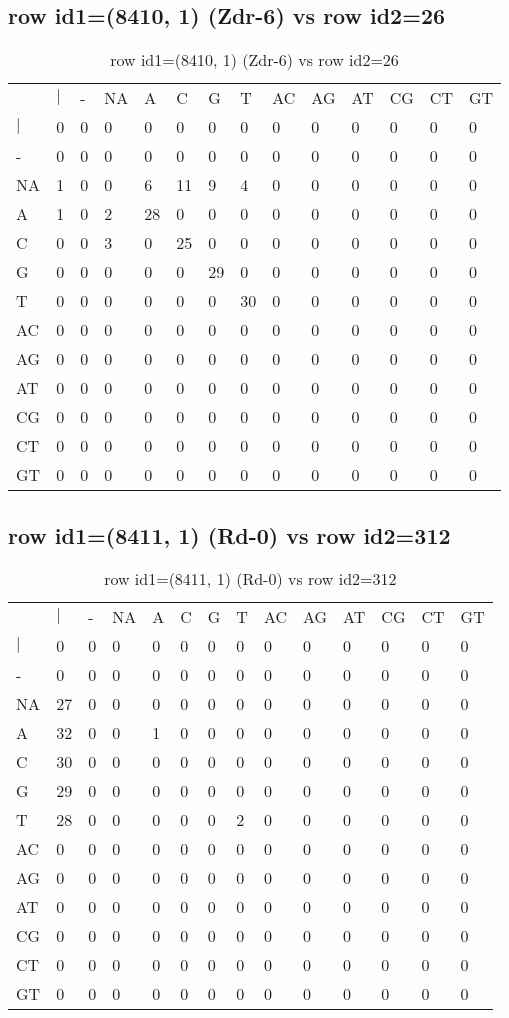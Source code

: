 \subsection{row id1=(8410, 1) (Zdr-6) vs row id2=26}
\begin{center}
\begin{longtable}{|l|l|l|l|l|l|l|l|l|l|l|l|l|l|}
\caption{row id1=(8410, 1) (Zdr-6) vs row id2=26} \label{table_dm682}\\
\hline
\\
\hline
&$|$&-&NA&A&C&G&T&AC&AG&AT&CG&CT&GT\\
$|$&0&0&0&0&0&0&0&0&0&0&0&0&0\\
-&0&0&0&0&0&0&0&0&0&0&0&0&0\\
NA&1&0&0&6&11&9&4&0&0&0&0&0&0\\
A&1&0&2&28&0&0&0&0&0&0&0&0&0\\
C&0&0&3&0&25&0&0&0&0&0&0&0&0\\
G&0&0&0&0&0&29&0&0&0&0&0&0&0\\
T&0&0&0&0&0&0&30&0&0&0&0&0&0\\
AC&0&0&0&0&0&0&0&0&0&0&0&0&0\\
AG&0&0&0&0&0&0&0&0&0&0&0&0&0\\
AT&0&0&0&0&0&0&0&0&0&0&0&0&0\\
CG&0&0&0&0&0&0&0&0&0&0&0&0&0\\
CT&0&0&0&0&0&0&0&0&0&0&0&0&0\\
GT&0&0&0&0&0&0&0&0&0&0&0&0&0\\
\hline
\end{longtable}
\end{center}

\subsection{row id1=(8411, 1) (Rd-0) vs row id2=312}
\begin{center}
\begin{longtable}{|l|l|l|l|l|l|l|l|l|l|l|l|l|l|}
\caption{row id1=(8411, 1) (Rd-0) vs row id2=312} \label{table_dm684}\\
\hline
\\
\hline
&$|$&-&NA&A&C&G&T&AC&AG&AT&CG&CT&GT\\
$|$&0&0&0&0&0&0&0&0&0&0&0&0&0\\
-&0&0&0&0&0&0&0&0&0&0&0&0&0\\
NA&27&0&0&0&0&0&0&0&0&0&0&0&0\\
A&32&0&0&1&0&0&0&0&0&0&0&0&0\\
C&30&0&0&0&0&0&0&0&0&0&0&0&0\\
G&29&0&0&0&0&0&0&0&0&0&0&0&0\\
T&28&0&0&0&0&0&2&0&0&0&0&0&0\\
AC&0&0&0&0&0&0&0&0&0&0&0&0&0\\
AG&0&0&0&0&0&0&0&0&0&0&0&0&0\\
AT&0&0&0&0&0&0&0&0&0&0&0&0&0\\
CG&0&0&0&0&0&0&0&0&0&0&0&0&0\\
CT&0&0&0&0&0&0&0&0&0&0&0&0&0\\
GT&0&0&0&0&0&0&0&0&0&0&0&0&0\\
\hline
\end{longtable}
\end{center}

